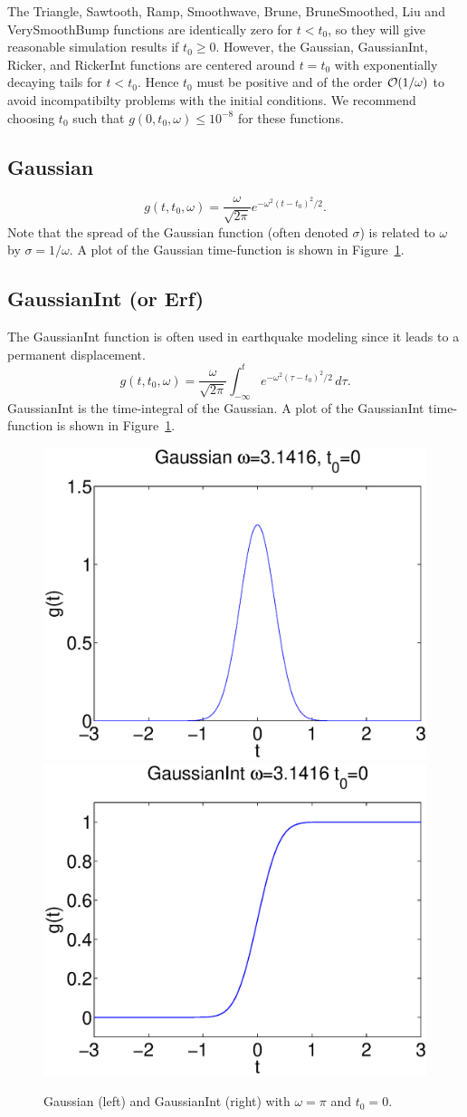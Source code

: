 \documentclass[11pt]{report}
\begin{document}
The Triangle, Sawtooth, Ramp, Smoothwave, Brune, BruneSmoothed, Liu and VerySmoothBump functions are
identically zero for $t<t_0$, so they will give reasonable simulation results if $t_0\geq
0$. However, the Gaussian, GaussianInt, Ricker, and RickerInt functions are centered around $t=t_0$
with exponentially decaying tails for $t<t_0$. Hence $t_0$ must be positive and of the order ${\cal
  O}(1/\omega)$ to avoid incompatibilty problems with the initial conditions. We recommend choosing
$t_0$ such that $g(0,t_0,\omega) \leq 10^{-8}$ for these functions.

\subsection{Gaussian}\label{gaussian}
  \[
  g(t,t_0,\omega) = \dfrac{\omega}{\sqrt{2 \pi}} e^{-\omega^2 (t - t_0)^2 /2}.
  \] 
Note that the spread of the Gaussian function (often denoted $\sigma$) is related to $\omega$ by
$\sigma = 1 / \omega$. A plot of the Gaussian time-function is shown in Figure~\ref{fig:gaussians}.
\subsection{GaussianInt (or Erf)}\label{gaussianint}
The GaussianInt function is often used in earthquake modeling since it leads to a permanent
displacement.
\[
g(t,t_0,\omega) = \dfrac{\omega}{\sqrt{2 \pi}} \int_{-\infty}^t e^{-\omega^2 (\tau - t_0)^2/2}\,d\tau.
\] 
GaussianInt is the time-integral of the Gaussian. A plot of the
GaussianInt time-function is shown in Figure~\ref{fig:gaussians}.
\begin{figure}
\begin{centering}
  \includegraphics[width=0.4\linewidth]{f1-gaussian.ps}
  \includegraphics[width=0.4\linewidth]{f2-gaussianint.ps}
  \caption{Gaussian (left) and GaussianInt (right) with $\omega=\pi$ and $t_0=0$.}
  \label{fig:gaussians}
\end{centering}
\end{figure}  
%
\end{document}

